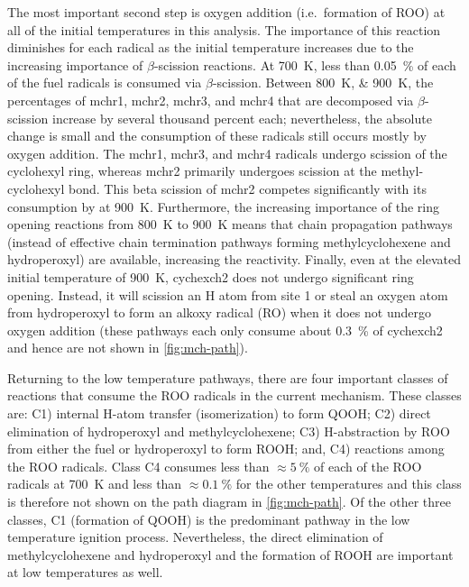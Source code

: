 \documentclass[../main.tex]{subfiles}
\begin{document}
The most important second step is oxygen addition (i.e.\ formation of ROO) at
all of the initial temperatures in this analysis. The importance of this
reaction diminishes for each radical as the initial temperature increases due
to the increasing importance of $\beta$-scission reactions. At \SI{700}{\kelvin}, less than
\SI{0.05}{\percent} of each of the fuel radicals is consumed via $\beta$-scission. Between
\SIlist{800;900}{\kelvin}, the percentages of mchr1, mchr2, mchr3, and mchr4 that are decomposed
via $\beta$-scission increase by several thousand percent each; nevertheless,
the absolute change is small and the consumption of these radicals still occurs
mostly by oxygen addition. The mchr1, mchr3, and mchr4 radicals undergo
scission of the cyclohexyl ring, whereas mchr2 primarily undergoes scission at the
methyl-cyclohexyl bond. This beta scission of mchr2 competes significantly with
its consumption by  at \SI{900}{\kelvin}. Furthermore, the increasing importance of the
ring opening reactions from \SI{800}{\kelvin} to \SI{900}{\kelvin} means that chain propagation pathways
(instead of effective chain termination pathways forming methylcyclohexene and
hydroperoxyl) are available, increasing the reactivity. Finally, even at the
elevated initial temperature of \SI{900}{\kelvin}, cychexch2 does not undergo significant
ring opening. Instead, it will scission an H atom from site 1 or steal an oxygen
atom from hydroperoxyl to form an alkoxy radical (RO) when it does not undergo
oxygen addition (these pathways each only consume about \SI{0.3}{\percent} of cychexch2 and
hence are not shown in \cref{fig:mch-path}).

Returning to the low temperature pathways, there are four important classes of
reactions that consume the ROO radicals in the current mechanism. These classes
are: C1) internal H-atom transfer (isomerization) to form QOOH; C2) direct
elimination of hydroperoxyl and methylcyclohexene; C3) H-abstraction by ROO
from either the fuel or hydroperoxyl to form ROOH; and, C4) reactions among the
ROO radicals. Class C4 consumes less than $\approx\SI{5}{\percent}$ of each of the ROO radicals at
\SI{700}{\kelvin} and less than $\approx\SI{0.1}{\percent}$ for the other temperatures and this class is
therefore not shown on the path diagram in \cref{fig:mch-path}. Of the other
three classes, C1 (formation of QOOH) is the predominant pathway in the low
temperature ignition process. Nevertheless, the direct elimination of
methylcyclohexene and hydroperoxyl and the formation of ROOH are important at
low temperatures as well.
\end{document}

